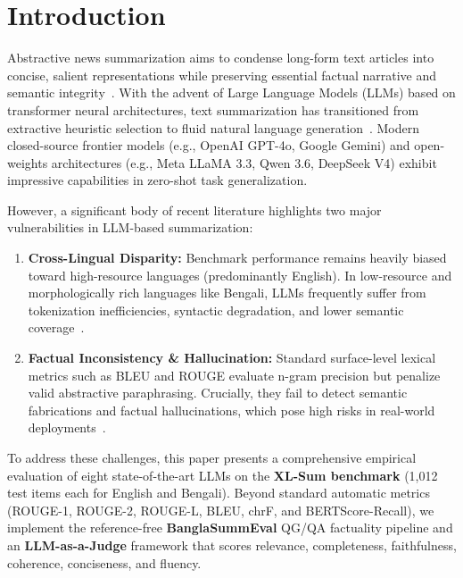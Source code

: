 \documentclass[runningheads]{llncs}
\begin{document}
%
%
\section{Introduction}\label{sec:intro}

Abstractive news summarization aims to condense long-form text articles into concise, salient representations while preserving essential factual narrative and semantic integrity~\cite{lin2004}. With the advent of Large Language Models (LLMs) based on transformer neural architectures, text summarization has transitioned from extractive heuristic selection to fluid natural language generation~\cite{zhang2019,zheng2023}. Modern closed-source frontier models (e.g., OpenAI GPT-4o, Google Gemini) and open-weights architectures (e.g., Meta LLaMA 3.3, Qwen 3.6, DeepSeek V4) exhibit impressive capabilities in zero-shot task generalization.

However, a significant body of recent literature highlights two major vulnerabilities in LLM-based summarization:
\begin{enumerate}
    \item \textbf{Cross-Lingual Disparity:} Benchmark performance remains heavily biased toward high-resource languages (predominantly English). In low-resource and morphologically rich languages like Bengali, LLMs frequently suffer from tokenization inefficiencies, syntactic degradation, and lower semantic coverage~\cite{vanveen2024}.
    \item \textbf{Factual Inconsistency \& Hallucination:} Standard surface-level lexical metrics such as BLEU and ROUGE evaluate n-gram precision but penalize valid abstractive paraphrasing. Crucially, they fail to detect semantic fabrications and factual hallucinations, which pose high risks in real-world deployments~\cite{farquhar2024,tang2023}.
\end{enumerate}

To address these challenges, this paper presents a comprehensive empirical evaluation of eight state-of-the-art LLMs on the \textbf{XL-Sum benchmark} (1,012 test items each for English and Bengali). Beyond standard automatic metrics (ROUGE-1, ROUGE-2, ROUGE-L, BLEU, chrF, and BERTScore-Recall), we implement the reference-free \textbf{BanglaSummEval} QG/QA factuality pipeline and an \textbf{LLM-as-a-Judge} framework that scores relevance, completeness, faithfulness, coherence, conciseness, and fluency.
\end{document}

